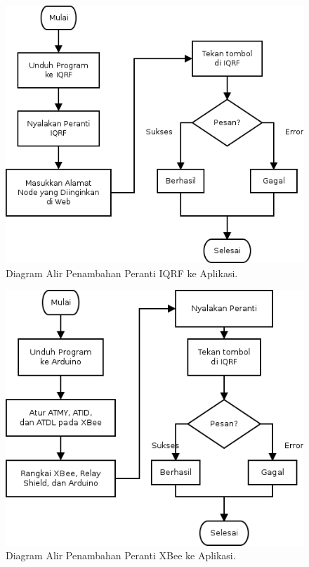 			\begin{figure}[ht!]
			  \centering
			    \includegraphics{gambar/add-iqrf}
			    \caption{Diagram Alir Penambahan Peranti IQRF ke Aplikasi.}
			    \label{add-iqrf}
			\end{figure}

			\begin{figure}[ht!]
			  \centering
			    \includegraphics{gambar/add-xbee}
			    \caption{Diagram Alir Penambahan Peranti XBee ke Aplikasi.}
			    \label{add-xbee}
			\end{figure}

